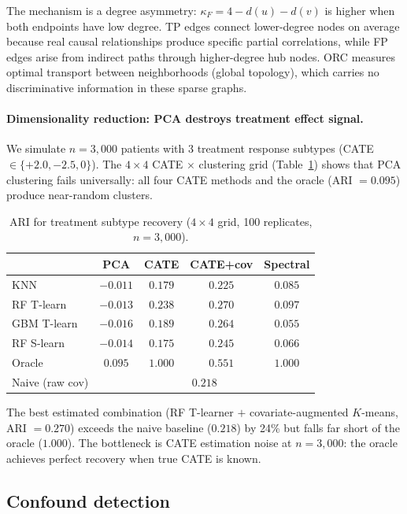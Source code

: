 \documentclass{article}
\begin{document}
The mechanism is a degree asymmetry: $\kappa_F = 4 - d(u) - d(v)$ is higher when both endpoints have low degree.
TP edges connect lower-degree nodes on average because real causal relationships produce specific partial correlations, while FP edges arise from indirect paths through higher-degree hub nodes.
ORC measures optimal transport between neighborhoods (global topology), which carries no discriminative information in these sparse graphs.

\paragraph{Dimensionality reduction: PCA destroys treatment effect signal.}
We simulate $n = 3{,}000$ patients with 3 treatment response subtypes (CATE $\in \{+2.0, -2.5, 0\}$).
The $4 \times 4$ CATE $\times$ clustering grid (Table~\ref{tab:hte}) shows that PCA clustering fails universally: all four CATE methods and the oracle (ARI $= 0.095$) produce near-random clusters.

\begin{table}[t]
\centering
\caption{ARI for treatment subtype recovery ($4 \times 4$ grid, 100 replicates, $n = 3{,}000$).}
\label{tab:hte}
\small
\begin{tabular}{@{}lcccc@{}}
\toprule
 & \textbf{PCA} & \textbf{CATE} & \textbf{CATE+cov} & \textbf{Spectral} \\
\midrule
KNN       & $-0.011$ & $0.179$ & $0.225$ & $0.085$ \\
RF T-learn  & $-0.013$ & $0.238$ & $\mathbf{0.270}$ & $0.097$ \\
GBM T-learn & $-0.016$ & $0.189$ & $0.264$ & $0.055$ \\
RF S-learn  & $-0.014$ & $0.175$ & $0.245$ & $0.066$ \\
\midrule
Oracle        & $0.095$  & $1.000$ & $0.551$ & $1.000$ \\
Naive (raw cov) & \multicolumn{4}{c}{$0.218$} \\
\bottomrule
\end{tabular}
\end{table}

The best estimated combination (RF T-learner $+$ covariate-augmented $K$-means, ARI $= 0.270$) exceeds the naive baseline ($0.218$) by 24\% but falls far short of the oracle ($1.000$).
The bottleneck is CATE estimation noise at $n = 3{,}000$: the oracle achieves perfect recovery when true CATE is known.

\subsection{Confound detection}
\label{sec:res-confound}
\end{document}
